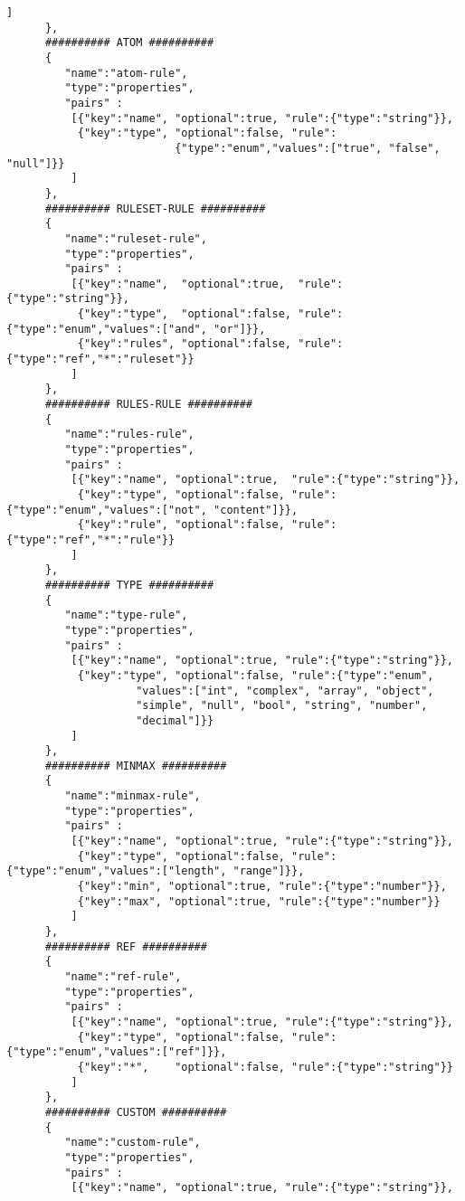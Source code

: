 \documentclass[a4paper]{article}
\begin{document}
\begin{lstlisting}[basicstyle=\ttfamily\scriptsize{}]
          ]
      },
      ########## ATOM ##########
      {
         "name":"atom-rule",
         "type":"properties",
         "pairs" :
          [{"key":"name", "optional":true, "rule":{"type":"string"}},
           {"key":"type", "optional":false, "rule":
                          {"type":"enum","values":["true", "false", "null"]}}
          ]
      },
      ########## RULESET-RULE ##########
      {
         "name":"ruleset-rule",
         "type":"properties",
         "pairs" :
          [{"key":"name",  "optional":true,  "rule":{"type":"string"}},
           {"key":"type",  "optional":false, "rule":{"type":"enum","values":["and", "or"]}},
           {"key":"rules", "optional":false, "rule":{"type":"ref","*":"ruleset"}}
          ]
      },
      ########## RULES-RULE ##########
      {
         "name":"rules-rule",
         "type":"properties",
         "pairs" :
          [{"key":"name", "optional":true,  "rule":{"type":"string"}},
           {"key":"type", "optional":false, "rule":{"type":"enum","values":["not", "content"]}},
           {"key":"rule", "optional":false, "rule":{"type":"ref","*":"rule"}}
          ]
      },
      ########## TYPE ##########
      {
         "name":"type-rule",
         "type":"properties",
         "pairs" :
          [{"key":"name", "optional":true, "rule":{"type":"string"}},
           {"key":"type", "optional":false, "rule":{"type":"enum",
                    "values":["int", "complex", "array", "object", 
                    "simple", "null", "bool", "string", "number", 
                    "decimal"]}}
          ]
      },
      ########## MINMAX ##########
      {
         "name":"minmax-rule",
         "type":"properties",
         "pairs" :
          [{"key":"name", "optional":true, "rule":{"type":"string"}},
           {"key":"type", "optional":false, "rule":{"type":"enum","values":["length", "range"]}},
           {"key":"min", "optional":true, "rule":{"type":"number"}},
           {"key":"max", "optional":true, "rule":{"type":"number"}}
          ]
      },
      ########## REF ##########
      {
         "name":"ref-rule",
         "type":"properties",
         "pairs" :
          [{"key":"name", "optional":true, "rule":{"type":"string"}},
           {"key":"type", "optional":false, "rule":{"type":"enum","values":["ref"]}},
           {"key":"*",    "optional":false, "rule":{"type":"string"}}
          ]
      },
      ########## CUSTOM ##########
      {
         "name":"custom-rule",
         "type":"properties",
         "pairs" :
          [{"key":"name", "optional":true, "rule":{"type":"string"}},

\end{lstlisting}
\end{document}
